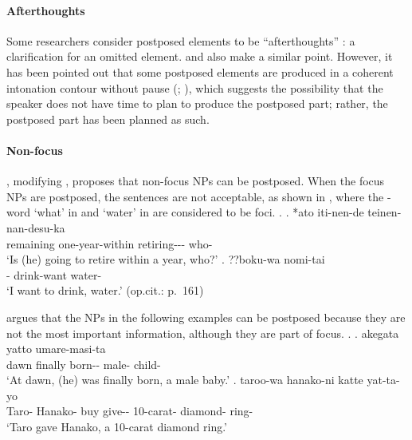 \paragraph{Afterthoughts}

Some researchers consider postposed elements to be ``afterthoughts'' \cite[259]{shibatani90}:
a clarification for an omitted element.
 and  also make a similar point.
However,
it has been pointed out that
some postposed elements are produced in a coherent intonation contour without pause (; ),
which suggests the possibility that
the speaker does not have time to plan to produce the postposed part;
rather, the postposed part has been planned as such.




\paragraph{Non-focus}

,
modifying ,
proposes that non-focus NPs can be postposed.
When the focus NPs are postposed,
the sentences are not acceptable,
as shown in \Next,
where the -word  `what' in \Next[a] and
 `water' in \Next[b] are considered to be foci.
%
\ex.
 \ag. *ato iti-nen-de teinen-nan-desu-ka  \\
      remaining one-year-within retiring--- who- \\
      `Is (he) going to retire within a year, who?'
      \hfill{\cite[160]{takami95b}}      
 \bg. ??boku-wa nomi-tai  \\
      - drink-want water- \\
      `I want to drink, water.'
      \hfill{(op.cit.: p.~161)}

 argues that
the NPs in the following examples can be postposed because
they are not the most important information,
although they are part of focus.
%
\ex.
 \ag. akegata yatto umare-masi-ta   \\
      dawn finally born-- male- child- \\
      `At dawn, (he) was finally born, a male baby.'
 \bg. taroo-wa hanako-ni katte yat-ta-yo    \\
      Taro- Hanako- buy give-- 10-carat- diamond- ring- \\
      `Taro gave Hanako, a 10-carat diamond ring.'
      \hfill{\cite[236]{takami95a}}

